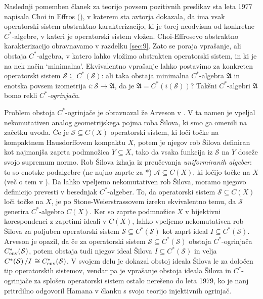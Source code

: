 Naslednji pomemben članek za teorijo povsem pozitivnih preslikav sta leta 1977 napisala Choi in Effros (\cite{choieffros1977}),
v katerem sta avtorja dokazala, da ima vsak operatorski sistem abstraktno karakterizacijo, ki je torej neodvisna od konkretne $C^*$-algebre,
v kateri je operatorski sistem vložen. Choi-Effrosevo abstraktno karakterizacijo obravnavamo v razdelku \ref{sec:9}.
Zato se poraja vprašanje, ali obstaja $C^*$-algebra, v katero lahko vložimo abstrakten operatorski sistem, in ki je na nek način `minimalna'.
Ekvivalentno vprašanje lahko postavimo za konkreten operatorski sistem $\mathcal{S} \subseteq C^*(\mathcal{S})$: ali taka obstaja minimalna $C^*$-algebra 
$\mathfrak{A}$ in enotska povsem izometrija $i: \mathcal{S} \to \mathfrak{A}$, da je $\mathfrak{A} = C^*(i(\mathcal{S}))$?
Takšni $C^*$-algebri $\mathfrak{A}$ bomo rekli \emph{$C^*$-ogrinjača}.

Problem obstoja $C^*$-ogrinjače je obravnaval že Arveson v \cite{arveson1969}.
V ta namen je vpeljal nekomutativen analog geometrijskega pojma roba Šilova, ki smo ga omenili na začetku uvoda.
Če je $\mathcal{S} \subseteq C(X)$ operatorski sistem, ki loči točke na kompaktnem Hausdorffovem kompaktu $X$,
potem je njegov rob Šilova definiran kot najmanjša zaprta podmnožica $Y \subseteq X$,
tako da vsaka funkcija iz $\mathcal{S}$ na $Y$ doseže svojo supremum normo.
Rob Šilova izhaja iz preučevanja \emph{uniformiranih algeber}:
to so enotske podalgebre (ne nujno zaprte za $*$) $\mathcal{A} \subseteq C(X)$, ki {ločijo točke na $X$}
(več o tem v \cite{gamelin1969}). Da lahko vpeljemo nekomutativen rob Šilova,
moramo njegovo definicijo prevesti v besednjak $C^*$-algeber.
To, da operatorski sistem $\mathcal{S} \subseteq C(X)$ loči točke na $X$,
je po Stone-Weierstrassovem izreku ekvivalentno temu, da $\mathcal{S}$ generira $C^*$-algebro $C(X)$.
Ker so zaprte podmnožice $X$ v bijektivni korespondenci z zaprtimi ideali v $C(X)$, lahko vpeljemo 
nekomutativen rob Šilova za poljuben operatorski sistem $\mathcal{S} \subseteq C^*(\mathcal{S})$ kot zaprt ideal $I \subseteq C^*(\mathcal{S})$. 
Arveson je opazil, da če za operatorski sistem $\mathcal{S} \subseteq C^*(\mathcal{S})$ obstaja $C^*$-ogrinjača $C^* _{\operatorname{env}} (\mathcal{S})$,
potem obstaja tudi njegov ideal Šilova $I \subseteq C^*(\mathcal{S})$ in velja $\quot{C^*(\mathcal{S})}{I} \cong C_{\env} ^* (\mathcal{S})$.
V svojem delu je dokazal obstoj ideala Šilova le za določen tip operatorskih sistemov, vendar pa je vprašanje obstoja ideala Šilova in $C^*$-ogrinjače 
za splošen operatorski sistem ostalo nerešeno do
leta 1979, ko je nanj pritrdilno odgovoril Hamana v članku \cite{hamana1979} s svojo teorijo injektivnih ogrinjač.

